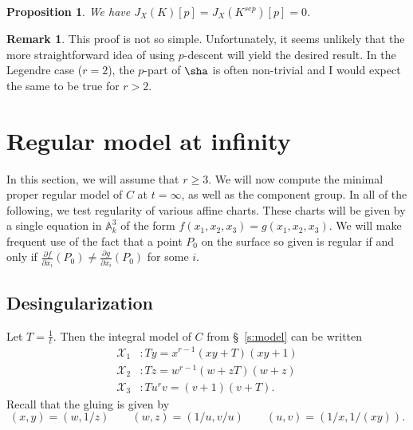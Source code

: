 \documentclass[reqno]{amsart}
\newtheorem{prop}[thm]{Proposition}
\theoremstyle{definition}
\newtheorem{rem}[thm]{Remark}
\theoremstyle{remark}
\def\XX{\mathcal{X}}
\begin{document}
\begin{prop}
We have $J_X(K)[p]=J_X(K^{sep})[p]=0$.
\end{prop}

\begin{rem} 
  This proof is not so simple. Unfortunately, it seems
  unlikely that the more straightforward idea of using $p$-descent
  will yield the desired result. In the Legendre case ($r=2$), the
  $p$-part of $\sha$ is often non-trivial and I would expect the same
  to be true for $r>2$. 
\end{rem}













\section{Regular model at infinity}


In this section, we will assume that $r \geq 3$. We will now compute the minimal proper regular model of $C$ at $t = \infty$, as well as the component group. In all of the following, we test regularity of various affine charts. These charts will be given by a single equation in $\mathbb{A}^3_k$ of the form $f(x_1,x_2,x_3) = g(x_1,x_2,x_3)$. We will make frequent use of the fact that a point $P_0$ on the surface so given is regular if and only if $\frac{\partial f}{\partial x_i}(P_0) \neq \frac{\partial g}{\partial x_i}(P_0)$ for some $i$.

\subsection{Desingularization}
\label{sec:desingularization}

Let $T = \frac{1}{t}$. Then the integral model of $C$ from \S~\ref{s:model} can be written
\begin{align*}
  \XX_1&: Ty = x^{r-1}(xy+T)(xy+1) \\
  \XX_2&: Tz = w^{r-1}(w+zT)(w+z) \\
  \XX_3&: Tu^rv = (v+1)(v+T).
\end{align*}
Recall that the gluing is given by
\[
(x,y)=(w,1/z)\qquad(w,z)=(1/u,v/u)\qquad(u,v)=(1/x,1/(xy)).
\]
\end{document}
